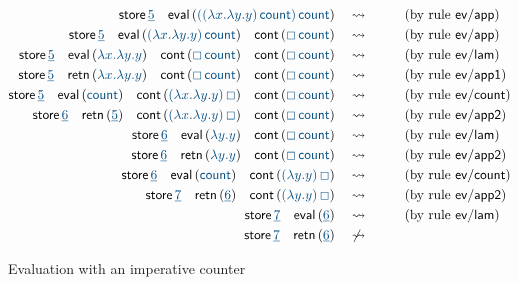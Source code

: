 \begin{figure}
\begin{align*}
{\sf store}\,\obj{\underline 5} \quad
{\sf eval}\,(\obj{((\lambda x.\lambda y.y)\,{\sf count})\,{\sf count}})
& ~~~\rightsquigarrow~~ \tag{by rule ${\sf ev/app}$}\\
{\sf store}\,\obj{\underline 5} \quad
{\sf eval}\,(\obj{(\lambda x.\lambda y.y)\,{\sf count}}) \quad
{\sf cont}\,(\obj{\Box\,{\sf count}})
& ~~~\rightsquigarrow~~ \tag{by rule ${\sf ev/app}$}\\
{\sf store}\,\obj{\underline 5} \quad
{\sf eval}\,(\obj{\lambda x.\lambda y.y}) \quad
{\sf cont}\,(\obj{\Box\,{\sf count}}) \quad
{\sf cont}\,(\obj{\Box\,{\sf count}})
& ~~~\rightsquigarrow~~ \tag{by rule ${\sf ev/lam}$}\\
{\sf store}\,\obj{\underline 5} \quad
{\sf retn}\,(\obj{\lambda x.\lambda y.y}) \quad
{\sf cont}\,(\obj{\Box\,{\sf count}}) \quad
{\sf cont}\,(\obj{\Box\,{\sf count}})
& ~~~\rightsquigarrow~~ \tag{by rule ${\sf ev/app1}$}\\
{\sf store}\,\obj{\underline 5} \quad
{\sf eval}\,(\obj{\sf count}) \quad
{\sf cont}\,(\obj{(\lambda x.\lambda y.y)\,\Box}) \quad
{\sf cont}\,(\obj{\Box\,{\sf count}})
& ~~~\rightsquigarrow~~ \tag{by rule ${\sf ev/count}$}\\
{\sf store}\,\obj{\underline 6} \quad
{\sf retn}\,(\obj{\underline 5}) \quad
{\sf cont}\,(\obj{(\lambda x.\lambda y.y)\,\Box}) \quad
{\sf cont}\,(\obj{\Box\,{\sf count}})
& ~~~\rightsquigarrow~~ \tag{by rule ${\sf ev/app2}$}\\
{\sf store}\,\obj{\underline 6} \quad
{\sf eval}\,(\obj{\lambda y.y}) \quad
{\sf cont}\,(\obj{\Box\,{\sf count}})
& ~~~\rightsquigarrow~~ \tag{by rule ${\sf ev/lam}$}\\
{\sf store}\,\obj{\underline 6} \quad
{\sf retn}\,(\obj{\lambda y.y}) \quad
{\sf cont}\,(\obj{\Box\,{\sf count}})
& ~~~\rightsquigarrow~~ \tag{by rule ${\sf ev/app2}$}\\
{\sf store}\,\obj{\underline 6} \quad
{\sf eval}\,(\obj{{\sf count}}) \quad
{\sf cont}\,(\obj{(\lambda y.y)\,\Box})
& ~~~\rightsquigarrow~~ \tag{by rule ${\sf ev/count}$}\\
{\sf store}\,\obj{\underline 7} \quad
{\sf retn}\,(\obj{\underline 6}) \quad
{\sf cont}\,(\obj{(\lambda y.y)\,\Box})
& ~~~\rightsquigarrow~~ \tag{by rule ${\sf ev/app2}$}\\
{\sf store}\,\obj{\underline 7} \quad
{\sf eval}\,(\obj{\underline 6}) 
& ~~~\rightsquigarrow~~ \tag{by rule ${\sf ev/lam}$}\\
{\sf store}\,\obj{\underline 7} \quad
{\sf retn}\,(\obj{\underline 6}) 
& ~~~\not\rightsquigarrow~~ 
\end{align*}
\caption{Evaluation with an imperative counter}
\label{fig:eval-ssos-ctr}
\end{figure}


